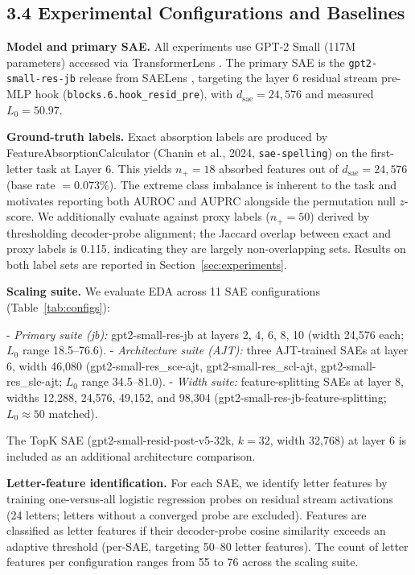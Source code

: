 \documentclass{article}
\begin{document}
\subsection{3.4 Experimental Configurations and Baselines}

\textbf{Model and primary SAE.} All experiments use GPT-2 Small (117M parameters) accessed via
TransformerLens \citep{nanda2022transformerlens}. The primary SAE is the
\texttt{gpt2-small-res-jb} release from SAELens \citep{bloom2024saelens}, targeting the
layer 6 residual stream pre-MLP hook (\texttt{blocks.6.hook\_resid\_pre}), with $d_\text{sae}
= 24{,}576$ and measured $L_0 = 50.97$.

\textbf{Ground-truth labels.} Exact absorption labels are produced by FeatureAbsorptionCalculator
(Chanin et al., 2024, \texttt{sae-spelling}) on the first-letter task at Layer 6. This yields
$n_+ = 18$ absorbed features out of $d_\text{sae} = 24{,}576$ (base rate $= 0.073\%$). The
extreme class imbalance is inherent to the task and motivates reporting both AUROC and
AUPRC alongside the permutation null $z$-score. We additionally evaluate against proxy labels
($n_+ = 50$) derived by thresholding decoder-probe alignment; the Jaccard overlap between
exact and proxy labels is 0.115, indicating they are largely non-overlapping sets. Results
on both label sets are reported in Section~\ref{sec:experiments}.

\textbf{Scaling suite.} We evaluate EDA across 11 SAE configurations (Table~\ref{tab:configs}):

- \textit{Primary suite (jb):} gpt2-small-res-jb at layers 2, 4, 6, 8, 10 (width 24,576 each;
  $L_0$ range 18.5–76.6).
- \textit{Architecture suite (AJT):} three AJT-trained SAEs at layer 6, width 46,080
  (gpt2-small-res\_sce-ajt, gpt2-small-res\_scl-ajt, gpt2-small-res\_sle-ajt;
  $L_0$ range 34.5–81.0).
- \textit{Width suite:} feature-splitting SAEs at layer 8, widths 12,288, 24,576, 49,152, and
  98,304 (gpt2-small-res-jb-feature-splitting; $L_0 \approx 50$ matched).

The TopK SAE (gpt2-small-resid-post-v5-32k, $k = 32$, width 32,768) at layer 6 is included
as an additional architecture comparison.

\textbf{Letter-feature identification.} For each SAE, we identify letter features by training
one-versus-all logistic regression probes on residual stream activations (24 letters; letters
without a converged probe are excluded). Features are classified as letter features if their
decoder-probe cosine similarity exceeds an adaptive threshold (per-SAE, targeting 50–80
letter features). The count of letter features per configuration ranges from 55 to 76 across
the scaling suite.
\end{document}
